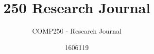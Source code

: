 \documentclass{scrartcl}
\title{250 Research Journal}
\subtitle{COMP250 - Research Journal}
\author{1606119}
\begin{document}
\maketitle


\noindent 




\raggedright


\end{document}
